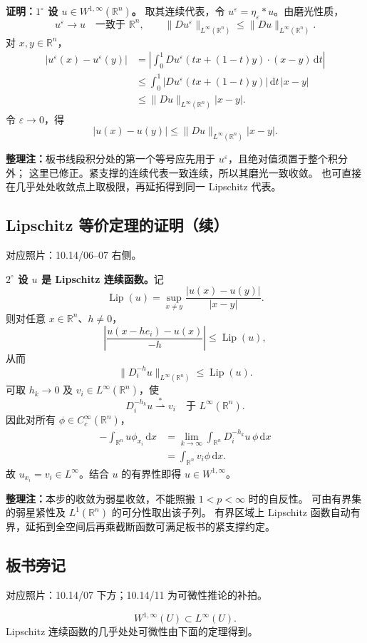 \documentclass[UTF8,a4paper,11pt,fontset=fandol]{ctexart}
\newcommand{\R}{\mathbb R}
\newcommand{\dd}{\,\mathrm d}
\newcommand{\ednote}[1]{\par{\small\color{notegray}\textbf{整理注：}#1}\par}
\newcommand{\source}[1]{{\small\color{notegray}对应照片：#1。}\par}
\begin{document}
\textbf{证明：$1^\circ$ 设 $u\in W^{1,\infty}(\R^n)$。}
取其连续代表，令 $u^\varepsilon=\eta_\varepsilon*u$。由磨光性质，
\[
u^\varepsilon\longrightarrow u\quad\text{一致于 }\R^n,\qquad
\|Du^\varepsilon\|_{L^\infty(\R^n)}
\leq\|Du\|_{L^\infty(\R^n)}.
\]
对 $x,y\in\R^n$，
\[
\begin{aligned}
|u^\varepsilon(x)-u^\varepsilon(y)|
&=\left|\int_0^1Du^\varepsilon(tx+(1-t)y)\cdot(x-y)\dd t\right|\\
&\leq\int_0^1|Du^\varepsilon(tx+(1-t)y)|\dd t\,|x-y|\\
&\leq\|Du\|_{L^\infty(\R^n)}|x-y|.
\end{aligned}
\]
令 $\varepsilon\to0$，得
\[
|u(x)-u(y)|\leq\|Du\|_{L^\infty(\R^n)}|x-y|.
\]
\ednote{板书线段积分处的第一个等号应先用于 $u^\varepsilon$，且绝对值须置于整个积分外；
这里已修正。紧支撑的连续代表一致连续，所以其磨光一致收敛。
也可直接在几乎处处收敛点上取极限，再延拓得到同一 Lipschitz 代表。}

\newpage
\subsection*{Lipschitz 等价定理的证明（续）}
\source{10.14/06--07 右侧}
\textbf{$2^\circ$ 设 $u$ 是 Lipschitz 连续函数。}记
\[
\operatorname{Lip}(u)=\sup_{x\ne y}\frac{|u(x)-u(y)|}{|x-y|}.
\]
则对任意 $x\in\R^n$、$h\ne0$，
\[
\left|\frac{u(x-he_i)-u(x)}{-h}\right|
\leq\operatorname{Lip}(u),
\]
从而
\[
\|D_i^{-h}u\|_{L^\infty(\R^n)}\leq\operatorname{Lip}(u).
\]
可取 $h_k\to0$ 及 $v_i\in L^\infty(\R^n)$，使
\[
D_i^{-h_k}u\overset{*}{\rightharpoonup}v_i
\quad\text{于 }L^\infty(\R^n).
\]
因此对所有 $\phi\in C_c^\infty(\R^n)$，
\[
\begin{aligned}
-\int_{\R^n}u\phi_{x_i}\dd x
&=\lim_{k\to\infty}\int_{\R^n}D_i^{-h_k}u\,\phi\dd x\\
&=\int_{\R^n}v_i\phi\dd x.
\end{aligned}
\]
故 $u_{x_i}=v_i\in L^\infty$。结合 $u$ 的有界性即得 $u\in W^{1,\infty}$。
\ednote{本步的收敛为弱星收敛，不能照搬 $1<p<\infty$ 时的自反性。
可由有界集的弱星紧性及 $L^1(\R^n)$ 的可分性取出该子列。
有界区域上 Lipschitz 函数自动有界，延拓到全空间后再乘截断函数可满足板书的紧支撑约定。}

\subsection*{板书旁记}
\source{10.14/07 下方；10.14/11 为可微性推论的补拍}
\[
W^{1,\infty}(U)\subset L^\infty(U).
\]
Lipschitz 连续函数的几乎处处可微性由下面的定理得到。
\end{document}

